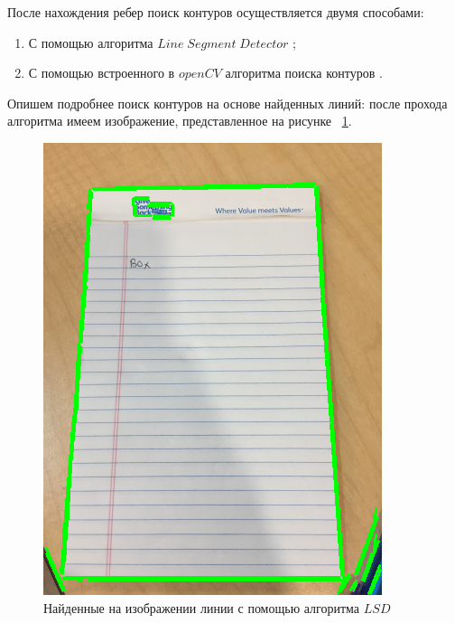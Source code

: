 После нахождения ребер поиск контуров осуществляется двумя способами:
\begin{enumerate}
    \item С помощью алгоритма $Line\;Segment\;Detector$ \cite{lsd};
    \item С помощью встроенного в $openCV$ алгоритма поиска контуров \cite{opencv_contours}.
\end{enumerate}

Опишем подробнее поиск контуров на основе найденных линий: после прохода алгоритма имеем изображение, представленное на рисунке ~\ref{lsd_img}.
\begin{figure}
    \includegraphics[scale=0.25]{img/perspective/lsd.png}
    \caption{Найденные на изображении линии с помощью алгоритма $LSD$}
    \label{lsd_img}
\end{figure}

